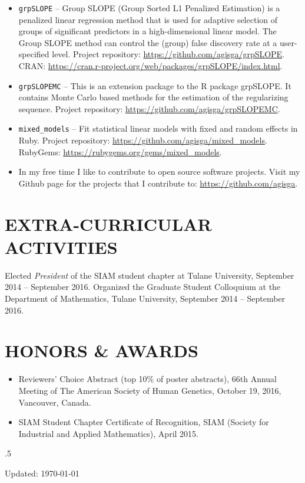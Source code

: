 \documentclass[margin]{res} %
\begin{document}
\begin{resume}
\begin{itemize} \itemsep -2pt %
    \item \verb!grpSLOPE! -- Group SLOPE (Group Sorted L1 Penalized Estimation) is a penalized linear regression method that is used for adaptive selection of groups of significant predictors in a high-dimensional linear model. The Group SLOPE method can control the (group) false discovery rate at a user-specified level. Project repository: \url{https://github.com/agisga/grpSLOPE}. CRAN: \url{https://cran.r-project.org/web/packages/grpSLOPE/index.html}.
    \item \verb!grpSLOPEMC! -- This is an extension package to the R package grpSLOPE. It contains Monte Carlo based methods for the estimation of the regularizing sequence. Project repository: \url{https://github.com/agisga/grpSLOPEMC}.
    \item \verb!mixed_models! -- Fit statistical linear models with fixed and random effects in Ruby. Project repository: \url{https://github.com/agisga/mixed_models}. RubyGems: \url{https://rubygems.org/gems/mixed_models}.
    \item In my free time I like to contribute to open source software projects. Visit my Github page for the projects that I contribute to: \url{https://github.com/agisga}.
\end{itemize}


\section{EXTRA-CURRICULAR \\ ACTIVITIES}

Elected {\it President} of the SIAM student chapter at Tulane University, September 2014 -- September 2016.
Organized the Graduate Student Colloquium at the Department of Mathematics, Tulane University, September 2014 -- September 2016.


\section{HONORS \& AWARDS}

\begin{itemize}
  \item Reviewers’ Choice Abstract (top 10\% of poster abstracts), 66th Annual Meeting of The American Society of Human Genetics, October 19, 2016, Vancouver, Canada.
  \item SIAM Student Chapter Certificate of Recognition, SIAM (Society for Industrial and Applied Mathematics), April 2015.
\end{itemize}

\vfill
\moveleft.5\hoffset\centerline{Updated: \today}


\end{resume}
\end{document}

